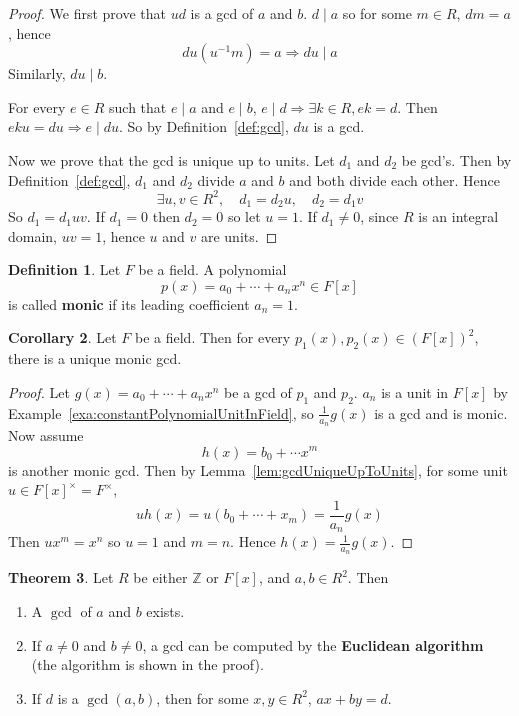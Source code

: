 \documentclass[12pt,a4paper]{article}
\theoremstyle{definition}
\newtheorem{definition}{Definition}[subsection]
\newtheorem{theorem}[definition]{Theorem}
\newtheorem{corollary}[definition]{Corollary}
\begin{document}
\begin{proof}
	We first prove that $ud$ is a gcd of $a$ and $b$. $d \mid a$ so for some $m \in R$, $dm = a$, hence
	\[
		du (u^{-1} m) = a \Longrightarrow du \mid a
	\]
	Similarly, $du \mid b$.

	For every $e \in R$ such that $e \mid a$ and $e \mid b$, $e \mid d \Longrightarrow \exists k \in R, ek = d$. Then $eku = du \Rightarrow e \mid du$. So by Definition~\ref{def:gcd}, $du$ is a gcd.

	Now we prove that the gcd is unique up to units. Let $d_1$ and $d_2$ be gcd's. Then by Definition~\ref{def:gcd}, $d_1$ and $d_2$ divide $a$ and $b$ and both divide each other. Hence
	\[
		\exists u, v \in R^2, \quad d_1 = d_2 u, \quad d_2 = d_1 v
	\]
	So $d_1 = d_1 uv$. If $d_1 = 0$ then $d_2 = 0$ so let $u = 1$. If $d_1 \ne 0$, since $R$ is an integral domain, $uv = 1$, hence $u$ and $v$ are units.
\end{proof}

\begin{definition}
	Let $F$ be a field. A polynomial
	\[
		p(x) = a_0 + \cdots + a_n x^n \in F[x]
	\]
	is called \textbf{monic} if its leading coefficient $a_n = 1$.
\end{definition}

\begin{corollary}
	Let $F$ be a field. Then for every $p_1(x), p_2(x) \in {(F[x])}^2$, there is a unique monic gcd.
\end{corollary}

\begin{proof}
	Let $g(x) = a_0 + \cdots + a_n x^n$ be a gcd of $p_1$ and $p_2$. $a_n$ is a unit in $F[x]$ by Example~\ref{exa:constantPolynomialUnitInField}, so $\frac{1}{a_n} g(x)$ is a gcd and is monic. Now assume
	\[
		h(x) = b_0 + \cdots x^m
	\]
	is another monic gcd. Then by Lemma~\ref{lem:gcdUniqueUpToUnits}, for some unit $u \in F[x]^{\times} = F^{\times}$,
	\[
		u h(x) = u(b_0 + \cdots + x_m) = \frac{1}{a_n} g(x)
	\]
	Then $u x^m = x^n$ so $u = 1$ and $m = n$. Hence $h(x) = \frac{1}{a_n} g(x)$.
\end{proof}

\begin{theorem}
	Let $R$ be either $\mathbb{Z}$ or $F[x]$, and $a, b \in R^2$. Then
	\begin{enumerate}
		\item A $\gcd$ of $a$ and $b$ exists.
		\item If $a \ne 0$ and $b \ne 0$, a gcd can be computed by the \textbf{Euclidean algorithm} (the algorithm is shown in the proof).
		\item If $d$ is a $\gcd(a, b)$, then for some $x, y \in R^2$, $ax + by = d$.
	\end{enumerate}
\end{theorem}
\end{document}

